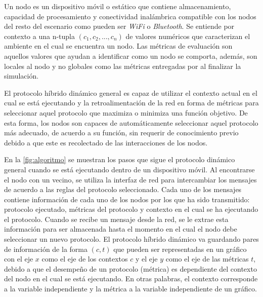 Un nodo es un dispositivo móvil o estático que contiene almacenamiento,
capacidad de procesamiento y conectividad inalámbrica compatible con los nodos
del resto del escenario como pueden ser \textit{WiFi} o \textit{Bluetooth}.  Se
entiende por contexto a una n-tupla $(c_1, c_2, ..., c_n)$ de valores numéricos
que caracterizan el ambiente en el cual se encuentra un nodo. Las métricas de
evaluación son aquellos valores que ayudan a identificar como un nodo se
comporta, además, son locales al nodo y no globales como las métricas entregadas
por \theone{} al finalizar la simulación.

El protocolo híbrido dinámico general es capaz de utilizar el contexto actual en
el cual se está ejecutando y la retroalimentación de la red en forma de métricas
para seleccionar aquel protocolo que maximiza o minimiza una función objetivo.
De esta forma, los nodos son capaces de automáticamente seleccionar aquel
protocolo más adecuado, de acuerdo a su función, sin requerir de conocimiento
previo debido a que este es recolectado de las interacciones de los nodos.







En la \ref{fig:algoritmo} se muestran los pasos que sigue el protocolo dinámico
general cuando se está ejecutando dentro de un dispositivo móvil. Al encontrarse
el nodo con un vecino, se utiliza la interfaz de red para intercambiar
los mensajes de acuerdo a las reglas del protocolo seleccionado. Cada uno de los
mensajes contiene información de cada uno de los nodos por los que ha sido
transmitido: protocolo ejecutado, métricas del protocolo y contexto en el cual se ha
ejecutando el protocolo. Cuando se recibe un mensaje desde la red, se le extrae
esta información para ser almacenada hasta el momento en el cual el nodo debe
seleccionar un nuevo protocolo. El protocolo híbrido dinámico va guardando pares
de información de la forma $(c, t)$ que pueden ser representadas en un gráfico
con el eje $x$ como el eje de los contextos $c$ y el eje $y$ como el eje de las
métricas $t$, debido a que el desempeño de un protocolo (métrica) es dependiente
del contexto del nodo en el cual se está ejecutando. En otras palabras, el
contexto corresponde a la variable independiente y la métrica a la variable
independiente de un gráfico.


